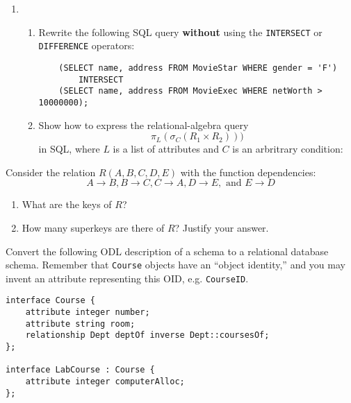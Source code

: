{{\begin{enumerate}
\item
  \begin{enumerate}
    \item Rewrite the following SQL query {\bf without} using
	the {\tt INTERSECT} or {\tt DIFFERENCE} operators:
\begin{verbatim}
    (SELECT name, address FROM MovieStar WHERE gender = 'F')
        INTERSECT
    (SELECT name, address FROM MovieExec WHERE netWorth > 10000000);
\end{verbatim}
	\vspace{1.5in}
    \item Show how to express the relational-algebra query
      $$
        \pi_L(\sigma_C(R_1 \times R_2)))
      $$
      in SQL, where $L$ is a list of attributes and $C$ is an arbritrary
      condition:
      \vspace{1in}
  \end{enumerate}

\end{enumerate}



\item Consider the relation $R(A,B,C,D,E)$ with the function
dependencies: 
$$
	A\rightarrow B,
	B\rightarrow C,
	C \rightarrow A,
	D \rightarrow E, \mbox{ and }
	E\rightarrow D
$$
\begin{enumerate}
    \item What are the keys of $R$?  
	\vspace{1in}
    \item How many superkeys are there of $R$?  Justify your answer.
	\vspace{1in}
\end{enumerate}


\newpage
\item Convert the following ODL description of a schema to a relational
database schema.  Remember that {\tt Course} objects have an ``object
identity,'' and you may invent an attribute representing this OID, 
e.g. {\tt CourseID}.  

\begin{verbatim}
interface Course {
    attribute integer number;
    attribute string room;
    relationship Dept deptOf inverse Dept::coursesOf;
};

interface LabCourse : Course {
    attribute integer computerAlloc;
};


\end{verbatim}}}

